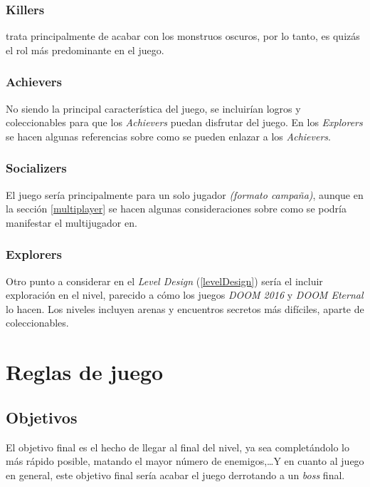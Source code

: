        \subsubsection{Killers}
            \TWD trata principalmente de acabar con los monstruos oscuros, por lo tanto, es quizás el rol más predominante en el juego.
        \subsubsection{Achievers}
            No siendo la principal característica del juego, se incluirían logros y coleccionables para que los \textit{Achievers} puedan disfrutar del juego. En los \textit{Explorers} se hacen algunas referencias sobre como se pueden enlazar a los \textit{Achievers}.
        \subsubsection{Socializers}
            El juego sería principalmente para un solo jugador \textit{(formato campaña)}, aunque en la sección \ref{multiplayer} se hacen algunas consideraciones sobre como se podría manifestar el multijugador en\TWD.
        \subsubsection{Explorers}
            Otro punto a considerar en el \textit{Level Design} (\ref{levelDesign}) sería el incluir exploración en el nivel, parecido a cómo los juegos \textit{DOOM 2016} y \textit{DOOM Eternal} lo hacen. Los niveles incluyen arenas y encuentros secretos más difíciles, aparte de coleccionables.

\section{Reglas de juego}

    \subsection{Objetivos}
        El objetivo final es el hecho de llegar al final del nivel, ya sea completándolo lo más rápido posible, matando el mayor número de enemigos,\dots\space Y en cuanto al juego en general, este objetivo final sería acabar el juego derrotando a un \textit{boss} final.
